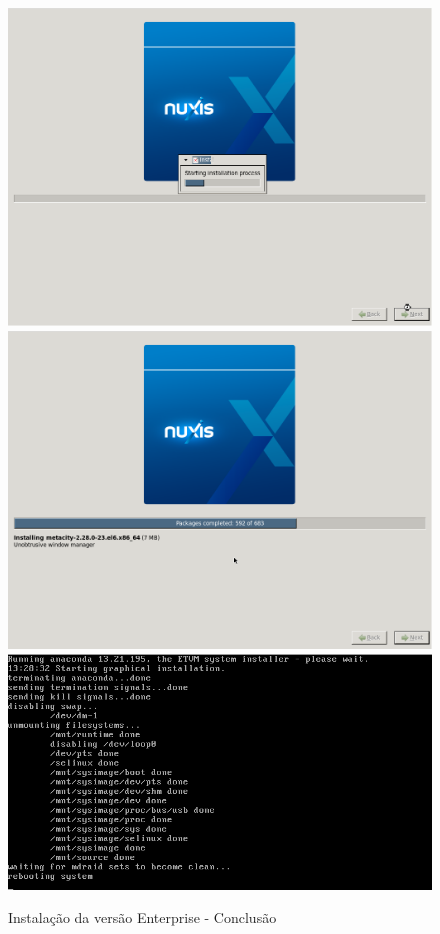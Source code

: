 \begin{figure}[H]
	\begin{center}
	\includegraphics[scale=0.2]{screenshots/install/nuxis/start_install.png}
	\includegraphics[scale=0.2]{screenshots/install/nuxis/install_progress_02.png}
	\includegraphics[scale=0.4]{screenshots/install/nuxis/install_reboot.png}
    \caption{Instalação da versão Enterprise - Conclusão}
	\label{fig:installation_enterprise_06}
	\end{center}
\end{figure}

